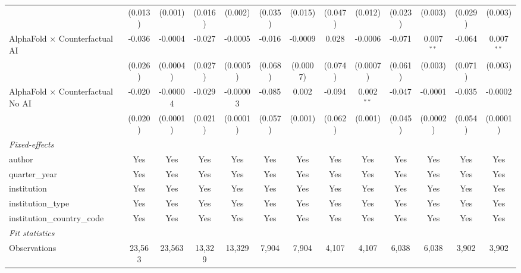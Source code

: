 \begin{tabular}{lcccccccccccc}
                                            & (0.013)      & (0.001)  & (0.016) & (0.002)  & (0.035) & (0.015)      & (0.047) & (0.012)       & (0.023) & (0.003)      & (0.029) & (0.003)\\   
   AlphaFold $\times$ Counterfactual AI     & -0.036       & -0.0004  & -0.027  & -0.0005  & -0.016  & -0.0009      & 0.028   & -0.0006       & -0.071  & 0.007$^{**}$ & -0.064  & 0.007$^{**}$\\   
                                            & (0.026)      & (0.0004) & (0.027) & (0.0005) & (0.068) & (0.0007)     & (0.074) & (0.0007)      & (0.061) & (0.003)      & (0.071) & (0.003)\\   
   AlphaFold $\times$ Counterfactual No AI  & -0.020       & -0.00004 & -0.029  & -0.00003 & -0.085  & 0.002        & -0.094  & 0.002$^{**}$  & -0.047  & -0.0001      & -0.035  & -0.0002\\   
                                            & (0.020)      & (0.0001) & (0.021) & (0.0001) & (0.057) & (0.001)      & (0.062) & (0.001)       & (0.045) & (0.0002)     & (0.054) & (0.0001)\\   
   \midrule
   \emph{Fixed-effects}\\
   author                                   & Yes          & Yes      & Yes     & Yes      & Yes     & Yes          & Yes     & Yes           & Yes     & Yes          & Yes     & Yes\\  
   quarter\_year                            & Yes          & Yes      & Yes     & Yes      & Yes     & Yes          & Yes     & Yes           & Yes     & Yes          & Yes     & Yes\\  
   institution                              & Yes          & Yes      & Yes     & Yes      & Yes     & Yes          & Yes     & Yes           & Yes     & Yes          & Yes     & Yes\\  
   institution\_type                        & Yes          & Yes      & Yes     & Yes      & Yes     & Yes          & Yes     & Yes           & Yes     & Yes          & Yes     & Yes\\  
   institution\_country\_code               & Yes          & Yes      & Yes     & Yes      & Yes     & Yes          & Yes     & Yes           & Yes     & Yes          & Yes     & Yes\\  
   \midrule
   \emph{Fit statistics}\\
   Observations                             & 23,563       & 23,563   & 13,329  & 13,329   & 7,904   & 7,904        & 4,107   & 4,107         & 6,038   & 6,038        & 3,902   & 3,902\\  

\end{tabular}
